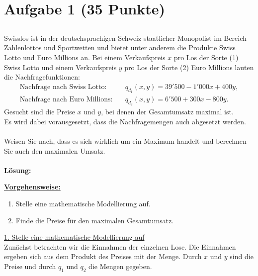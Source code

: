 \vspace{1cm}
\renewcommand{\labelenumi}{\theenumi.}
\section*{Aufgabe 1 (35 Punkte)}
\vspace{0.4cm}
\subsection*{}
Swisslos ist in der deutschsprachigen Schweiz staatlicher Monopolist im Bereich Zahlenlottos und Sportwetten und bietet unter anderem die Produkte Swiss Lotto und Euro Millions an.
Bei einem  Verkaufspreis $ x $ pro Los der Sorte (1) Swiss Lotto und einem Verkaufspreis $ y $ pro Los der Sorte (2) Euro Millions lauten die Nachfragefunktionen:
\begin{align*}
\textrm{Nachfrage nach Swiss Lotto:} 
&\quad
q_{d_1}(x,y) = 39'500 - 1'000 x + 400y,\\
\textrm{Nachfrage nach Euro Millions:}
&\quad
q_{d_2}(x,y) = 6'500 + 300 x - 800 y.
\end{align*}
Gesucht sind die Preise $ x $ und $ y $, bei denen der Gesamtumsatz maximal ist.\\
Es wird dabei vorausgesetzt, dass die Nachfragemengen auch abgesetzt werden.\\
\\
Weisen Sie nach, dass es sich wirklich um ein Maximum handelt und berechnen Sie auch den maximalen Umsatz.
\\
\\
\textbf{Lösung:}
\begin{mdframed}
\underline{\textbf{Vorgehensweise:}}
\renewcommand{\labelenumi}{\theenumi.}
\begin{enumerate}
\item Stelle eine mathematische Modellierung auf.
\item Finde die Preise für den maximalen Gesamtumsatz.

\end{enumerate}
\end{mdframed}
\underline{1. Stelle eine mathematische Modellierung auf}\\
Zunächst betrachten wir die Einnahmen der einzelnen Lose.
Die Einnahmen ergeben sich aus dem Produkt des Preises mit der Menge.
Durch $ x $ und $ y $ sind die Preise und durch $ q_1 $ und $ q_2 $ die Mengen gegeben.
